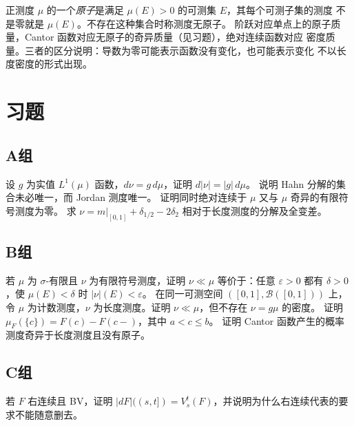 正测度 \(\mu\) 的一个\emph{原子}是满足 \(\mu(E)>0\) 的可测集 \(E\)，其每个可测子集的测度
不是零就是 \(\mu(E)\)。不存在这种集合时称测度无原子。
阶跃对应单点上的原子质量，Cantor 函数对应无原子的奇异质量（见习题），绝对连续函数对应
密度质量。三者的区分说明：导数为零可能表示函数没有变化，也可能表示变化
不以长度密度的形式出现。

\section*{习题}
\subsection*{A组}
\begin{enumerate}[label=\textbf{\thechapter.\arabic*.}]
设 \(g\) 为实值 \(L^1(\mu)\) 函数，\(d\nu=g\,d\mu\)，证明 \(d|\nu|=|g|\,d\mu\)。
说明 Hahn 分解的集合未必唯一，而 Jordan 测度唯一。
证明同时绝对连续于 \(\mu\) 又与 \(\mu\) 奇异的有限符号测度为零。
求 \(\nu=m|_{[0,1]}+\delta_{1/2}-2\delta_2\) 相对于长度测度的分解及全变差。
\end{enumerate}
\subsection*{B组}
\begin{enumerate}[label=\textbf{\thechapter.\arabic*.},resume]
若 \(\mu\) 为 \(\sigma\)-有限且 \(\nu\) 为有限符号测度，证明 \(\nu\ll\mu\) 等价于：任意 \(\varepsilon>0\) 都有 \(\delta>0\)，使 \(\mu(E)<\delta\) 时 \(|\nu|(E)<\varepsilon\)。
在同一可测空间 \(([0,1],\mathcal B([0,1]))\) 上，令 \(\mu\) 为计数测度，\(\nu\) 为长度测度。证明 \(\nu\ll\mu\)，但不存在 \(\nu=g\mu\) 的密度。
证明 \(\mu_F(\{c\})=F(c)-F(c-)\)，其中 \(a<c\le b\)。
证明 Cantor 函数产生的概率测度奇异于长度测度且没有原子。
\end{enumerate}
\subsection*{C组}
\begin{enumerate}[label=\textbf{\thechapter.\arabic*.},resume]
若 \(F\) 右连续且 BV，证明 \(|dF|((s,t])=V_s^t(F)\)，并说明为什么右连续代表的要求不能随意删去。
\end{enumerate}
